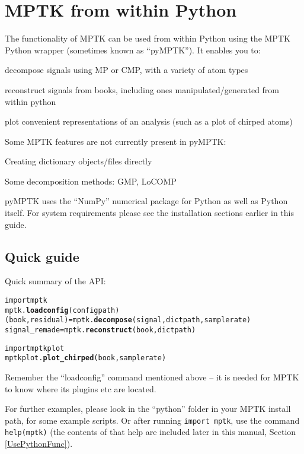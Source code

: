 \chapter{MPTK from within Python \label{GettingStartedPython}}

The functionality of MPTK can be used from within Python using the 
MPTK Python wrapper (sometimes known as ``pyMPTK''). It enables you to:
%
\begin{my_itemize}
\item decompose signals using MP or CMP, with a variety of atom types
\item reconstruct signals from books, including ones manipulated/generated from within python
\item plot convenient representations of an analysis (such as a plot of chirped atoms)
\end{my_itemize}
%
Some MPTK features are not currently present in pyMPTK:
\begin{my_itemize}
\item Creating dictionary objects/files directly
\item Some decomposition methods: GMP, LoCOMP
\end{my_itemize}

pyMPTK uses the ``NumPy'' numerical package for Python as well as Python itself.
For system requirements please see the installation sections earlier in this guide.

\section{Quick guide}
Quick summary of the API:

\begin{alltt}
	import mptk
	mptk.\textbf{loadconfig}(configpath)
	(book, residual) = mptk.\textbf{decompose}(signal, dictpath, samplerate)
	signal\_remade    = mptk.\textbf{reconstruct}(book, dictpath)

	import mptkplot
	mptkplot.\textbf{plot\_chirped}(book, samplerate)
\end{alltt}
%
Remember the ``loadconfig'' command mentioned above -- it is needed for MPTK
to know where its plugins etc are located.

For further examples, please look in the ``python'' folder in your MPTK install path, for some example scripts.
Or after running \texttt{import mptk}, use the command \texttt{help(mptk)}
(the contents of that help are included later in this manual, Section \ref{UsePythonFunc}).

